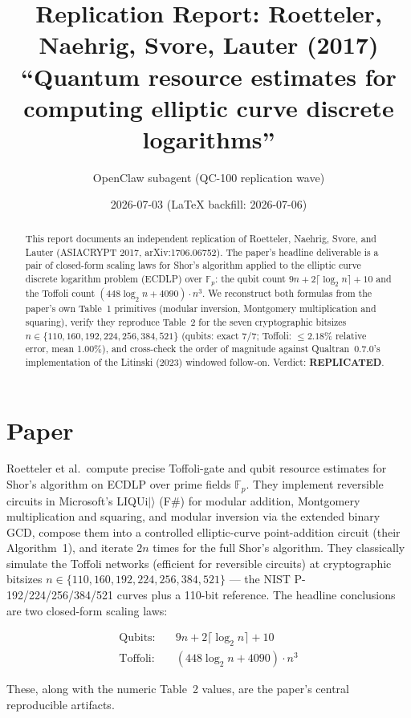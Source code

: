 \documentclass[11pt]{article}
\title{Replication Report: Roetteler, Naehrig, Svore, Lauter (2017)\\
\large ``Quantum resource estimates for computing elliptic curve discrete logarithms''}
\author{OpenClaw subagent (QC-100 replication wave)}
\date{2026-07-03 (LaTeX backfill: 2026-07-06)}
\begin{document}
\maketitle

\begin{abstract}
This report documents an independent replication of Roetteler, Naehrig, Svore, and
Lauter (ASIACRYPT 2017, arXiv:1706.06752). The paper's headline deliverable is a
pair of closed-form scaling laws for Shor's algorithm applied to the elliptic
curve discrete logarithm problem (ECDLP) over $\mathbb{F}_p$: the qubit count
$9n + 2\lceil \log_2 n\rceil + 10$ and the Toffoli count
$(448 \log_2 n + 4090) \cdot n^3$. We reconstruct both formulas from the paper's
own Table~1 primitives (modular inversion, Montgomery multiplication and squaring),
verify they reproduce Table~2 for the seven cryptographic bitsizes $n \in \{110,
160, 192, 224, 256, 384, 521\}$ (qubits: exact 7/7; Toffoli: $\le 2.18\%$ relative
error, mean 1.00\%), and cross-check the order of magnitude against Qualtran~0.7.0's
implementation of the Litinski (2023) windowed follow-on. Verdict: \textbf{REPLICATED}.
\end{abstract}

\section{Paper}

Roetteler et al.\ compute precise Toffoli-gate and qubit resource estimates for
Shor's algorithm on ECDLP over prime fields $\mathbb{F}_p$. They implement
reversible circuits in Microsoft's LIQUi$|\rangle$ (F\#) for modular addition,
Montgomery multiplication and squaring, and modular inversion via the extended
binary GCD, compose them into a controlled elliptic-curve point-addition circuit
(their Algorithm~1), and iterate $2n$ times for the full Shor's algorithm. They
classically simulate the Toffoli networks (efficient for reversible circuits) at
cryptographic bitsizes $n \in \{110, 160, 192, 224, 256, 384, 521\}$ --- the NIST
P-192/224/256/384/521 curves plus a 110-bit reference. The headline conclusions
are two closed-form scaling laws:

\begin{align}
\text{Qubits}: &\quad 9n + 2\lceil \log_2 n \rceil + 10 \\
\text{Toffoli}: &\quad (448 \log_2 n + 4090) \cdot n^3
\end{align}

These, along with the numeric Table~2 values, are the paper's central
reproducible artifacts.
\end{document}
